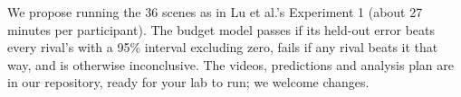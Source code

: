 We propose running the 36 scenes as in Lu et al.'s Experiment 1 (about 27 minutes per participant). The budget model passes if its held-out error beats every rival's with a 95\% interval excluding zero, fails if any rival beats it that way, and is otherwise inconclusive. The videos, predictions and analysis plan are in our repository, ready for your lab to run; we welcome changes.
